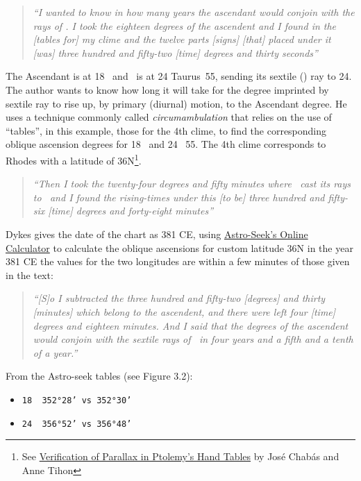 \begin{quote}
\textsl{``I wanted to know in how many years the ascendant would conjoin with the rays of \Mars. I took the eighteen degrees of the ascendent and I found in the [tables for] my clime and the twelve parts [signs] [that] placed under it [was] three hundred and fifty-two [time] degrees and thirty seconds''}
\end{quote}

The Ascendant is at 18 \Pisces\, and \Mars\, is at 24 Taurus\, 55, sending its sextile (\Sextile) ray to 24. The author wants to know how long it will take for the degree imprinted by \Mars\, sextile ray to rise up, by primary (diurnal) motion, to the Ascendant degree. He uses a technique commonly called \textsl{circumambulation} that relies on the use of ``tables'', in this example, those for the 4th clime, to find the corresponding oblique ascension degrees for 18 \Pisces\, and 24 \Taurus\, 55. The 4th clime corresponds to Rhodes with a latitude of 36N\footnote{See \href{https://journals.sagepub.com/doi/10.1177/002182869302400105}{Verification of Parallax in Ptolemy's Hand Tables} by José Chabás and Anne Tihon }.

\begin{quote}
\textsl{``Then  I took the twenty-four degrees and fifty minutes where \Mars\, cast its rays to \Pisces\, and I found the rising-times under this [to be] three hundred and fifty-six [time] degrees and forty-eight minutes''}
\end{quote}

Dykes gives the date of the chart as 381 CE, using \href{https://horoscopes.astro-seek.com/calculate-ascensional-rising-times/?latitude=100&narozeni_lat_custom_stupne=36&narozeni_lat_custom_minuty=0&narozeni_lat_custom_smer=0&narozeni_rok=381&aya=&oa=4&decimal=1}{Astro-Seek's Online Calculator} to calculate the oblique ascensions for custom latitude 36N in the year 381 CE the values for the two longitudes are within a few minutes of those given in the text:

\begin{quote}
\textsl{ ``[S]o I subtracted the three hundred and fifty-two [degrees] and thirty [minutes] which belong to the ascendent, and there were left four [time] degrees and eighteen minutes. And I said that the degrees of the ascendent would conjoin with the sextile rays of \Mars\, in four years and a fifth and a tenth of a year.''}
\end{quote}
From the Astro-seek tables (see Figure 3.2):
\begin{itemize}[topsep=0em,itemsep=0em]
\item[] \texttt{18\Pisces\,        352°28'    vs       352°30'}
\item[] \texttt{24\Pisces\,        356°52'    vs       356°48'}
\end{itemize}

